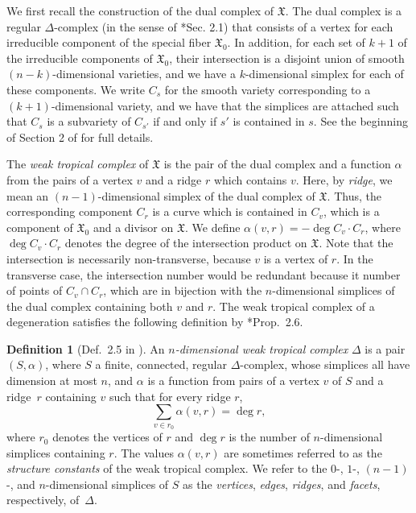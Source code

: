 \documentclass[11pt]{amsart}
\theoremstyle{definition}
\newtheorem{defn}[thm]{Definition}
\newcommand{\defi}[1]{\emph{#1}}
\newcommand{\degree}{\operatorname{deg}}
\newcommand{\X}{\mathfrak X}
\begin{document}
We first recall the construction of the dual complex of $\X$. The dual complex
is a regular $\Delta$-complex (in the sense of \cite{hatcher}*{Sec. 2.1}) that
consists of a vertex for each irreducible component of the special fiber $\X_0$.
In addition, for each set of $k+1$ of the irreducible components of $\X_0$,
their intersection is a disjoint union of smooth $(n-k)$-dimensional varieties,
and we have a $k$-dimensional simplex for each of these components. We write
$C_s$ for the smooth variety corresponding to a $(k+1)$-dimensional variety, and
we have that the simplices are attached such that $C_s$ is a subvariety of
$C_{s'}$ if and only if $s'$ is contained in $s$. See the beginning of Section 2
of \cite{cartwright-complexes} for full details.

The \defi{weak tropical complex} of $\X$ is the pair of the dual complex and a
function $\alpha$ from the pairs of a vertex $v$ and a ridge $r$ which contains
$v$. Here, by \defi{ridge}, we mean an $(n-1)$-dimensional simplex of the dual
complex of $\X$. Thus, the corresponding component $C_r$ is a curve which is
contained in $C_v$, which is a component of $\X_0$ and a divisor on $\X$. We
define $\alpha(v,r) = - \degree C_v \cdot C_r$, where $\deg C_v \cdot C_r$
denotes the degree of the intersection product on $\X$. Note that the
intersection is necessarily non-transverse, because $v$ is a vertex of $r$. In
the transverse case, the intersection number would be redundant because it
number of points of $C_v \cap C_r$, which are in bijection with the
$n$-dimensional simplices of the dual complex containing both $v$ and $r$. The
weak tropical complex of a degeneration satisfies the following definition by
\cite{cartwright-complexes}*{Prop.~2.6}.

\begin{defn}[Def.~2.5 in \cite{cartwright-complexes}]\label{d:weak-tropical-complex}
An \defi{$n$-dimensional weak tropical complex} $\Delta$ is a pair $(S,\alpha)$,
where $S$ a finite, connected, regular $\Delta$-complex,
whose simplices all have dimension at most $n$, and
$\alpha$ is a function from pairs of a vertex $v$ of $S$ and a ridge~$r$
containing $v$ such that for every ridge $r$,
\begin{equation}\label{eq:ridge-identity}
\sum_{v \in r_0} \alpha(v,r) = \degree r,
\end{equation}
where $r_0$ denotes the vertices of $r$ and $\degree r$ is the number
of $n$-dimensional simplices containing $r$. The values $\alpha(v,r)$ are
sometimes referred to as the \defi{structure constants} of the weak tropical
complex. We refer to the $0$-, $1$-,
$(n-1)$-, and $n$-dimensional simplices of $S$ as the \defi{vertices},
\defi{edges}, \defi{ridges}, and \defi{facets}, respectively,
of~$\Delta$.
\end{defn}
\end{document}
